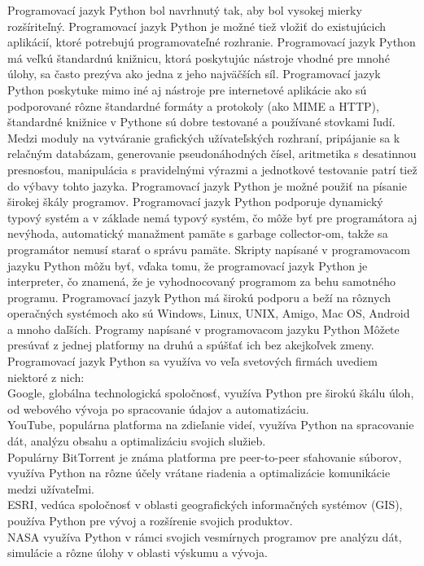 Programovací jazyk Python bol navrhnutý tak, aby bol vysokej mierky rozšíriteľný. Programovací jazyk Python je možné tiež vložiť do existujúcich aplikácií, ktoré potrebujú programovateľné rozhranie. Programovací jazyk Python má veľkú štandardnú knižnicu, ktorá poskytujúc nástroje vhodné pre mnohé úlohy, sa často prezýva ako jedna z jeho najväčších síl. Programovací jazyk Python poskytuke mimo iné aj nástroje pre internetové aplikácie ako sú podporované rôzne štandardné formáty a protokoly (ako MIME a HTTP), štandardné knižnice v Pythone sú dobre testované a používané stovkami ľudí. Medzi moduly na vytváranie grafických užívateľských rozhraní, pripájanie sa k relačným databázam, generovanie pseudonáhodných čísel, aritmetika s desatinnou presnosťou, manipulácia s pravidelnými výrazmi a jednotkové testovanie patrí tiež do výbavy tohto jazyka. Programovací jazyk Python je možné použiť na písanie širokej škály programov. Programovací jazyk Python podporuje dynamický typový systém a v základe nemá typový systém, čo môže byť pre programátora aj nevýhoda, automatický manažment pamäte s garbage collector-om, takže sa programátor nemusí starať o správu pamäte. Skripty napísané v programovacom jazyku Python môžu byť, vďaka tomu, že programovací jazyk Python je interpreter, čo znamená, že je vyhodnocovaný programom za behu samotného programu. Programovací jazyk Python má širokú podporu a beží na rôznych operačných systémoch ako sú Windows, Linux, UNIX, Amigo, Mac OS, Android a mnoho daľších. Programy napísané v programovacom jazyku Python Môžete presúvať z jednej platformy na druhú a spúšťať ich bez akejkoľvek zmeny.\\
Programovací jazyk Python sa využíva vo veľa svetových firmách uvediem niektoré z nich:\\
\tab[5 mm] Google, globálna technologická spoločnosť, využíva Python pre širokú škálu úloh, od webového vývoja po spracovanie údajov a automatizáciu.\\
\tab[5 mm] YouTube, populárna platforma na zdieľanie videí, využíva Python na spracovanie dát, analýzu obsahu a optimalizáciu svojich služieb.\\
\tab[5 mm] Populárny BitTorrent je známa platforma pre peer-to-peer sťahovanie súborov, využíva Python na rôzne účely vrátane riadenia a optimalizácie komunikácie medzi užívateľmi.\\
\tab[5 mm] ESRI, vedúca spoločnosť v oblasti geografických informačných systémov (GIS), používa Python pre vývoj a rozšírenie svojich produktov.\\
\tab[5 mm] NASA využíva Python v rámci svojich vesmírnych programov pre analýzu dát, simulácie a rôzne úlohy v oblasti výskumu a vývoja.\\

